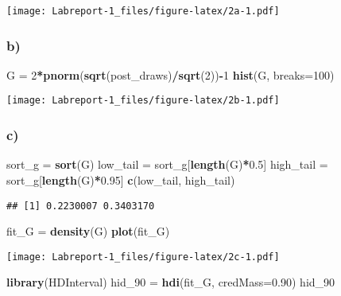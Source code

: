 \documentclass[]{article}
\newenvironment{Shaded}{\begin{snugshade}}{\end{snugshade}}
\newcommand{\DataTypeTok}[1]{\textcolor[rgb]{0.13,0.29,0.53}{#1}}
\newcommand{\DecValTok}[1]{\textcolor[rgb]{0.00,0.00,0.81}{#1}}
\newcommand{\FloatTok}[1]{\textcolor[rgb]{0.00,0.00,0.81}{#1}}
\newcommand{\KeywordTok}[1]{\textcolor[rgb]{0.13,0.29,0.53}{\textbf{#1}}}
\newcommand{\NormalTok}[1]{#1}
\newcommand{\OperatorTok}[1]{\textcolor[rgb]{0.81,0.36,0.00}{\textbf{#1}}}
\newcommand{\StringTok}[1]{\textcolor[rgb]{0.31,0.60,0.02}{#1}}
\begin{document}
\texttt{[image: Labreport-1\_files/figure-latex/2a-1.pdf]}

\hypertarget{b-1}{%
\subsubsection{b)}\label{b-1}}

\begin{Shaded}
\begin{Highlighting}[]
\NormalTok{G =}\StringTok{ }\DecValTok{2}\OperatorTok{*}\KeywordTok{pnorm}\NormalTok{(}\KeywordTok{sqrt}\NormalTok{(post_draws)}\OperatorTok{/}\KeywordTok{sqrt}\NormalTok{(}\DecValTok{2}\NormalTok{))}\OperatorTok{-}\DecValTok{1}
\KeywordTok{hist}\NormalTok{(G, }\DataTypeTok{breaks=}\DecValTok{100}\NormalTok{)}
\end{Highlighting}
\end{Shaded}

\texttt{[image: Labreport-1\_files/figure-latex/2b-1.pdf]}

\hypertarget{c-1}{%
\subsubsection{c)}\label{c-1}}

\begin{Shaded}
\begin{Highlighting}[]
\NormalTok{sort_g =}\StringTok{ }\KeywordTok{sort}\NormalTok{(G)}
\NormalTok{low_tail =}\StringTok{ }\NormalTok{sort_g[}\KeywordTok{length}\NormalTok{(G)}\OperatorTok{*}\FloatTok{0.5}\NormalTok{]}
\NormalTok{high_tail =}\StringTok{ }\NormalTok{sort_g[}\KeywordTok{length}\NormalTok{(G)}\OperatorTok{*}\FloatTok{0.95}\NormalTok{]}
\KeywordTok{c}\NormalTok{(low_tail, high_tail)}
\end{Highlighting}
\end{Shaded}

\begin{verbatim}
## [1] 0.2230007 0.3403170
\end{verbatim}

\begin{Shaded}
\begin{Highlighting}[]
\NormalTok{fit_G =}\StringTok{ }\KeywordTok{density}\NormalTok{(G)}
\KeywordTok{plot}\NormalTok{(fit_G)}
\end{Highlighting}
\end{Shaded}

\texttt{[image: Labreport-1\_files/figure-latex/2c-1.pdf]}

\begin{Shaded}
\begin{Highlighting}[]
\KeywordTok{library}\NormalTok{(HDInterval)}
\NormalTok{hid_}\DecValTok{90}\NormalTok{ =}\StringTok{ }\KeywordTok{hdi}\NormalTok{(fit_G, }\DataTypeTok{credMass=}\FloatTok{0.90}\NormalTok{)}
\NormalTok{hid_}\DecValTok{90}
\end{Highlighting}
\end{Shaded}
\end{document}
